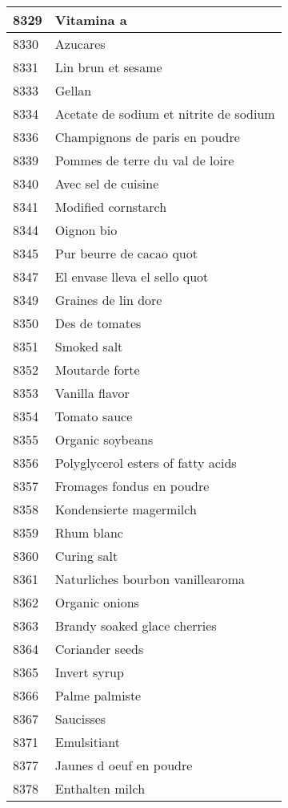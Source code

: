 \begin{longtable}{|l|l|}
8329 & Vitamina a \\ \hline 
8330 & Azucares \\ \hline 
8331 & Lin brun et sesame \\ \hline 
8333 & Gellan \\ \hline 
8334 & Acetate de sodium et nitrite de sodium \\ \hline 
8336 & Champignons de paris en poudre \\ \hline 
8339 & Pommes de terre du val de loire \\ \hline 
8340 & Avec sel de cuisine \\ \hline 
8341 & Modified cornstarch \\ \hline 
8344 & Oignon bio \\ \hline 
8345 & Pur beurre de cacao quot \\ \hline 
8347 & El envase lleva el sello quot \\ \hline 
8349 & Graines de lin dore \\ \hline 
8350 & Des de tomates \\ \hline 
8351 & Smoked salt \\ \hline 
8352 & Moutarde forte \\ \hline 
8353 & Vanilla flavor \\ \hline 
8354 & Tomato sauce \\ \hline 
8355 & Organic soybeans \\ \hline 
8356 & Polyglycerol esters of fatty acids \\ \hline 
8357 & Fromages fondus en poudre \\ \hline 
8358 & Kondensierte magermilch \\ \hline 
8359 & Rhum blanc \\ \hline 
8360 & Curing salt \\ \hline 
8361 & Naturliches bourbon vanillearoma \\ \hline 
8362 & Organic onions \\ \hline 
8363 & Brandy soaked glace cherries \\ \hline 
8364 & Coriander seeds \\ \hline 
8365 & Invert syrup \\ \hline 
8366 & Palme palmiste \\ \hline 
8367 & Saucisses \\ \hline 
8371 & Emulsitiant \\ \hline 
8377 & Jaunes d oeuf en poudre \\ \hline 
8378 & Enthalten milch \\ \hline 

\end{longtable}
